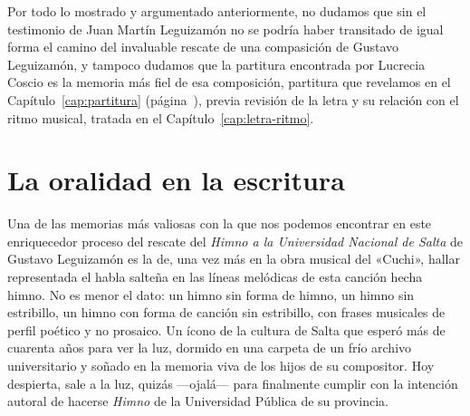 Por todo lo mostrado y argumentado anteriormente, no dudamos que sin el testimonio de Juan Martín Leguizamón no se podría haber transitado de igual forma el camino del invaluable rescate de una compasición de Gustavo Leguizamón, y tampoco dudamos que la partitura encontrada por Lucrecia Coscio es la memoria más fiel de esa composición, partitura que revelamos en el Capítulo~\ref{cap:partitura} (página~\pageref{cap:partitura}), previa revisión de la letra y su relación con el ritmo musical, tratada en el Capítulo~\ref{cap:letra-ritmo}.

\section{La oralidad en la escritura}
\label{sec:oralidad-escritura}

Una de las memorias más valiosas con la que nos podemos encontrar en este enriquecedor proceso del rescate del \emph{Himno a la Universidad Nacional de Salta} de Gustavo Leguizamón es la de, una vez más en la obra musical del «Cuchi», hallar representada el habla salteña en las líneas melódicas de esta canción hecha himno. No es menor el dato: un himno sin forma de himno, un himno sin estribillo, un himno con forma de canción sin estribillo, con frases musicales de perfil poético y no prosaico. Un ícono de la cultura de Salta que esperó más de cuarenta años para ver la luz, dormido en una carpeta de un frío archivo universitario y soñado en la memoria viva de los hijos de su compositor. Hoy despierta, sale a la luz, quizás ---ojalá--- para finalmente cumplir con la intención autoral de hacerse \emph{Himno} de la Universidad Pública de su provincia.
